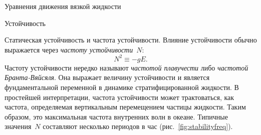 \begin{chapter}{Уравнения движения вязкой жидкости}
\begin{section}{Устойчивость}
\begin{paragraph}{Статическая устойчивость и частота устойчивости.}
Влияние устойчивости обычно выражается через 
\emph{частоту устойчивости}~$N$:
\begin{equation}\label{eq:8.36}
 N^2 \equiv -g E.
\end{equation}
Частоту устойчивости нередко называют 
\emph{частотой плавучести} 
либо \emph{частотой Бранта-Вяйсяля}. 
Она выражает величину устойчивости и является фундаментальной 
переменной в динамике стратифицированной жидкости. 
В простейшей интерпретации, частота устойчивости может трактоваться, как
частота, определяемая вертикальным перемещением
частицы жидкости. Таким образом, это максимальная частота внутренних
волн в океане. Типичные значения~$N$ составляют несколько периодов в час
(рис.~\ref{fig:stabilityfreq}).
%
\end{paragraph}


\end{section}
\end{chapter}
